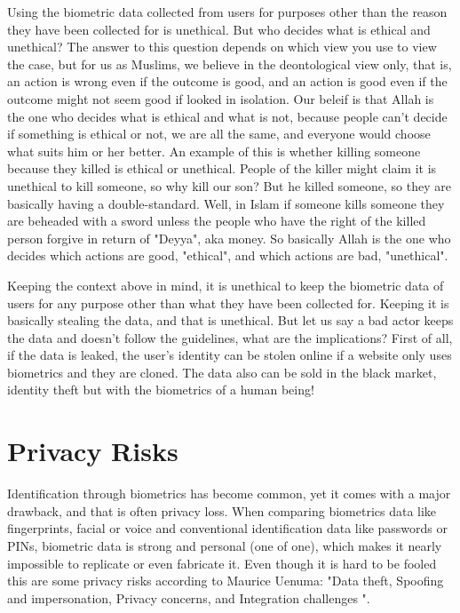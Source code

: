 \documentclass[conference]{IEEEtran}
\begin{document}
Using the biometric data collected from users for purposes other than the reason they have been collected for is unethical. But who decides what is ethical and unethical? The answer to this question depends on which view you use to view the case, but for us as Muslims, we believe in the deontological view only, that is, an action is wrong even if the outcome is good, and an action is good even if the outcome might not seem good if looked in isolation. Our beleif is that Allah is the one who decides what is ethical and what is not, because people can't decide if something is ethical or not, we are all the same, and everyone would choose what suits him or her better. An example of this is whether killing someone because they killed is ethical or unethical. People of the killer might claim it is unethical to kill someone, so why kill our son? But he killed someone, so they are basically having a double-standard. Well, in Islam if someone kills someone they are beheaded with a sword unless the people who have the right of the killed person forgive in return of "Deyya", aka money. So basically Allah is the one who decides which actions are good, "ethical", and which actions are bad, "unethical".

Keeping the context above in mind, it is unethical to keep the biometric data of users for any purpose other than what they have been collected for. Keeping it is basically stealing the data, and that is unethical. But let us say a bad actor keeps the data and doesn't follow the guidelines, what are the implications? First of all, if the data is leaked, the user's identity can be stolen online if a website only uses biometrics and they are cloned. The data also can be sold in the black market, identity theft but with the biometrics of a human being!

\section{Privacy Risks}

Identification through biometrics has become common, yet it comes with a major drawback, and that is often privacy loss. When comparing biometrics data like fingerprints, facial or voice and conventional identification data like passwords or PINs, biometric data is strong and personal (one of one), which makes it nearly impossible to replicate or even fabricate it. Even though it is hard to be fooled this are some privacy risks according to Maurice Uenuma: "Data theft, Spoofing and impersonation, Privacy concerns, and Integration challenges "\cite{darkreading2024}.
\end{document}
